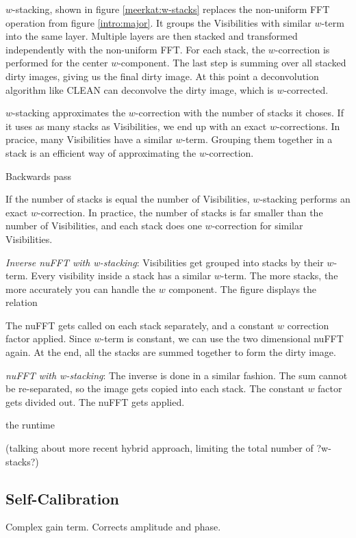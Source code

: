 $w$-stacking, shown in figure \ref{meerkat:w-stacks} replaces the non-uniform FFT operation from figure \ref{intro:major}. It groups the Visibilities with similar $w$-term into the same layer. Multiple layers are then stacked and transformed independently with the non-uniform FFT. For each stack, the $w$-correction is performed for the center $w$-component. The last step is summing over all stacked dirty images, giving us the final dirty image. At this point a deconvolution algorithm like CLEAN can deconvolve the dirty image, which is $w$-corrected. 

$w$-stacking approximates the $w$-correction with the number of stacks it choses. If it uses as many stacks as Visibilities, we end up with an exact $w$-corrections. In pracice, many Visibilities have a similar $w$-term. Grouping them together in a stack is an efficient way of approximating the $w$-correction.

Backwards pass



If the number of stacks is equal the number of Visibilities, $w$-stacking performs an exact $w$-correction. In practice, the number of stacks is far smaller than the number of Visibilities, and each stack does one $w$-correction for similar Visibilities. 


\textit{Inverse nuFFT with w-stacking}:
Visibilities get grouped into stacks by their $w$-term. Every visibility inside a stack has a similar $w$-term. The more stacks, the more accurately you can handle the $w$ component. The figure displays the relation

The nuFFT gets called on each stack separately, and a constant $w$ correction factor applied. Since $w$-term is constant, we can use the two dimensional nuFFT again. At the end, all the stacks are summed together to form the dirty image. 

\textit{nuFFT with w-stacking}:
The inverse is done in a similar fashion. The sum cannot be re-separated, so the image gets copied into each stack. The constant $w$ factor gets divided out. The nuFFT gets applied.

the runtime

(talking about more recent hybrid approach, limiting the total number of ?w-stacks?)



\subsection{Self-Calibration}
Complex gain term. Corrects amplitude and phase. 

